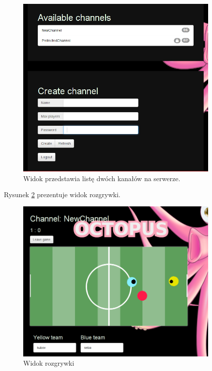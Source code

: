 \begin{figure}[h]
    \centering
    \includegraphics[width=0.9\textwidth]{imgs/twoChannels.png}
    \caption{Widok przedstawia listę dwóch kanałów na serwerze.}
    \label{fig:chans}
\end{figure}
\clearpage
Rysunek \ref{fig:game} prezentuje widok rozgrywki.
\begin{figure}[h]
    \centering
    \includegraphics[width=0.9\textwidth]{imgs/gameView.png}
    \caption{Widok rozgrywki}
    \label{fig:game}
\end{figure}






